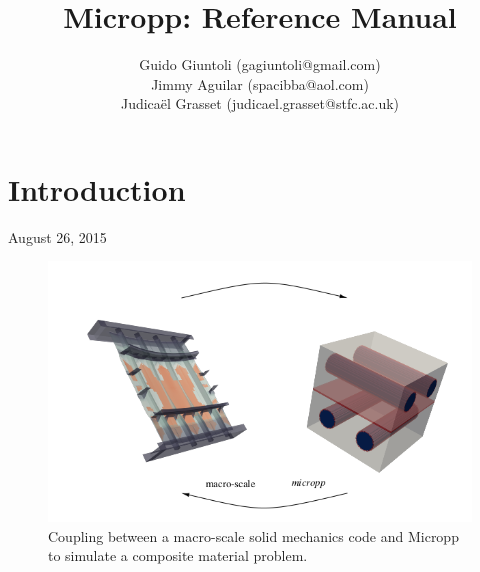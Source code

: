 \documentclass[conference, onecolumn]{IEEEtran}
\begin{document}
\title{Micropp: Reference Manual}


\author{
Guido Giuntoli (gagiuntoli@gmail.com) \\
Jimmy Aguilar (spacibba@aol.com) \\
Judica\"el Grasset (judicael.grasset@stfc.ac.uk)
}

\maketitle


\IEEEpeerreviewmaketitle

\section{Introduction}

\hfill August 26, 2015

\begin{figure}
	\centering
	\includegraphics[width=0.95\linewidth]{figures/coupling-micropp-macro.png}
	\caption{\label{fig:disp}
		Coupling between a macro-scale solid mechanics code and Micropp to simulate a composite material
		problem.
	}
\end{figure}
\end{document}
